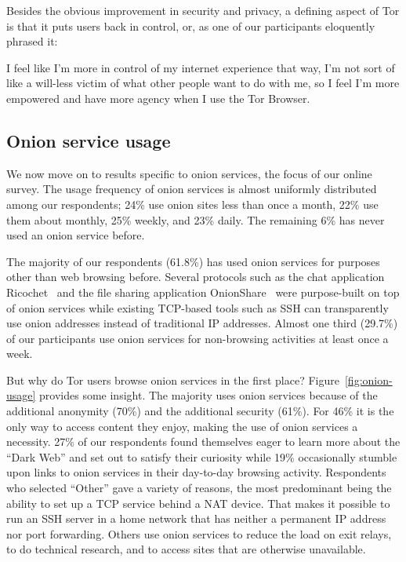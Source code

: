 Besides the obvious improvement in security and privacy, a defining aspect of
Tor is that it puts users back in control, or, as one of our participants
eloquently phrased it:

\begin{displayquote}[P02]
I feel like I'm more in control of my internet experience that way, I'm not sort
of like a will-less victim of what other people want to do with me, so I feel
I'm more empowered and have more agency when I use the Tor Browser.
\end{displayquote}

\subsection{Onion service usage}

We now move on to results specific to onion services, the focus of our online
survey.  The usage frequency of onion services is almost uniformly distributed
among our respondents; 24\% use onion sites less than once a month, 22\% use
them about monthly, 25\% weekly, and 23\% daily.  The remaining 6\% has never
used an onion service before.

The majority of our respondents (61.8\%) has used onion services for purposes
other than web browsing before.  Several protocols such as the chat application
Ricochet~\cite{ricochet} and the file sharing application
OnionShare~\cite{onionshare} were purpose-built on top of onion services while
existing TCP-based tools such as SSH can transparently use onion addresses
instead of traditional IP addresses.  Almost one third (29.7\%) of our
participants use onion services for non-browsing activities at least once a
week.

But why do Tor users browse onion services in the first place?
Figure~\ref{fig:onion-usage} provides some insight.  The majority uses onion
services because of the additional anonymity (70\%) and the additional security
(61\%).  For 46\% it is the only way to access content they enjoy, making the
use of onion services a necessity.  27\% of our respondents found themselves
eager to learn more about the ``Dark Web'' and set out to satisfy their
curiosity while 19\% occasionally stumble upon links to onion services in their
day-to-day browsing activity.  Respondents who selected ``Other'' gave a variety
of reasons, the most predominant being the ability to set up a TCP service
behind a NAT device.  That makes it possible to run an SSH server in a home
network that has neither a permanent IP address nor port forwarding.  Others use
onion services to reduce the load on exit relays, to do technical research, and
to access sites that are otherwise unavailable.

